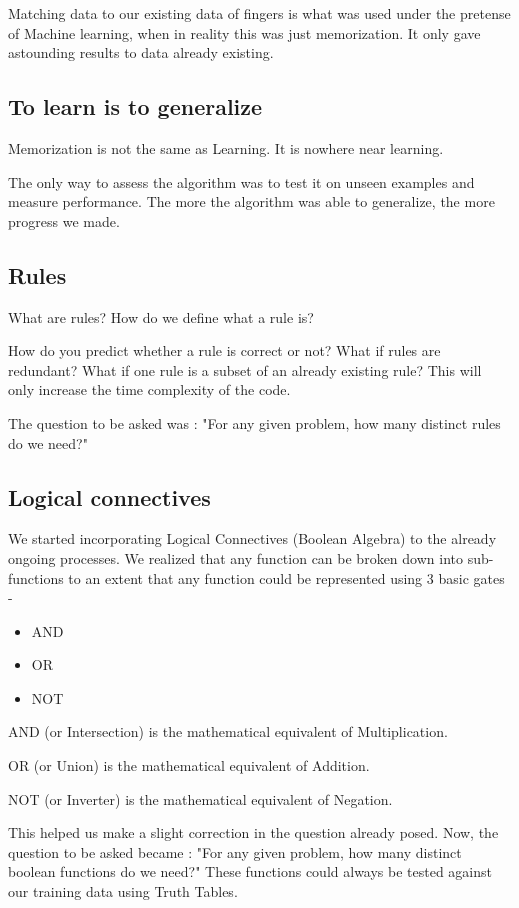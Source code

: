 \documentclass[a4paper]{article}
\begin{document}
Matching data to our existing data of fingers is what was used under the pretense of Machine learning, when in reality this was just memorization. It only gave astounding results to data already existing.  

\subsection{To learn is to generalize}

Memorization is not the same as Learning. It is nowhere near learning.

The only way to assess the algorithm was to test it on unseen examples and measure performance. The more the algorithm was able to generalize, the more progress we made.


\subsection{Rules}

What are rules? How do we define what a rule is? 

How do you predict whether a rule is correct or not? What if rules are redundant? What if one rule is a subset of an already existing rule? This will only increase the time complexity of the code. 

The question to be asked was : "For any given problem, how many distinct rules do we need?"

\subsection{Logical connectives}

We started incorporating Logical Connectives (Boolean Algebra) to the already ongoing processes. We realized that any function can be broken down into sub-functions to an extent that any function could be represented using 3 basic gates -
\begin{itemize}
\item  AND
\item  OR
\item  NOT
\end{itemize}

AND (or Intersection) is the mathematical equivalent of Multiplication.

OR (or Union) is the mathematical equivalent of Addition.

NOT (or Inverter) is the mathematical equivalent of Negation.

This helped us make a slight correction in the question already posed. Now, the question to be asked became : "For any given problem, how many distinct boolean functions do we need?"
These functions could always be tested against our training data using Truth Tables.
\end{document}
